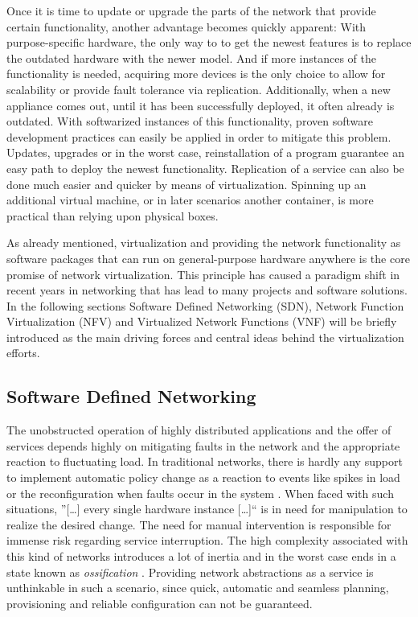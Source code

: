 Once it is time to update or upgrade the parts of the network that provide certain functionality, another advantage becomes quickly apparent: With purpose-specific hardware, the only way to to get the newest features is to replace the outdated hardware with the newer model. And if more instances of the functionality is needed, acquiring more devices is the only choice to allow for scalability or provide fault tolerance via replication. Additionally, when a new appliance comes out, until it has been successfully deployed, it often already is outdated. With softwarized instances of this functionality, proven software development practices can easily be applied in order to mitigate this problem. Updates, upgrades or in the worst case, reinstallation of a program guarantee an easy path to deploy the newest functionality. Replication of a service can also be done much easier and quicker by means of virtualization. Spinning up an additional virtual machine, or in later scenarios another container, is more practical than relying upon physical boxes. 

As already mentioned, virtualization and providing the network functionality as software packages that can run on general-purpose hardware anywhere is the core promise of network virtualization. This principle has caused a paradigm shift in recent years in networking that has lead to many projects and software solutions. In the following sections Software Defined Networking (SDN), Network Function Virtualization (NFV) and Virtualized Network Functions (VNF) will be briefly introduced as the main driving forces and central ideas behind the virtualization efforts. 

\subsection{Software Defined Networking}
\label{sec:sdn}
The unobstructed operation of highly distributed applications and the offer of services depends highly on mitigating faults in the network and the appropriate reaction to fluctuating load. In traditional networks, there is hardly any support to implement automatic policy change as a reaction to events like spikes in load or the reconfiguration when faults occur in the system \cite{kreutz2015software}. When faced with such situations, ''[\dots] every single hardware instance [\dots]`` \cite{grossmann2013auto} is in need for manipulation to realize the desired change.  The need for manual intervention is responsible for immense risk regarding service interruption. The high complexity associated with this kind of networks introduces a lot of inertia and in the worst case ends in a state known as \textit{ossification} \cite{nunes2014survey}. Providing network abstractions as a service is unthinkable in such a scenario, since quick, automatic and seamless planning, provisioning and reliable configuration can not be guaranteed.

